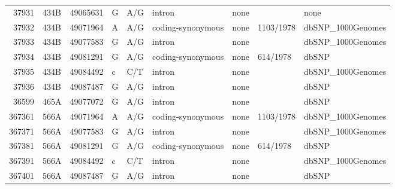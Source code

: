 \documentclass{article}
\begin{document}
\begin{table}[tbp]
{\begin{tabular}{rlrllllll}
  37931 & 434B & 49065631 & G & A/G & intron & none &  & none \\ 
  37932 & 434B & 49071964 & A & A/G & coding-synonymous & none & 1103/1978 & dbSNP\_1000Genomes \\ 
  37933 & 434B & 49077583 & G & A/G & intron & none &  & dbSNP\_1000Genomes \\ 
  37934 & 434B & 49081291 & G & A/G & coding-synonymous & none & 614/1978 & dbSNP \\ 
  37935 & 434B & 49084492 & c & C/T & intron & none &  & dbSNP\_1000Genomes \\ 
  37936 & 434B & 49087487 & G & A/G & intron & none &  & dbSNP \\ 
  36599 & 465A & 49077072 & G & A/G & intron & none &  & dbSNP \\ 
  367361 & 566A & 49071964 & A & A/G & coding-synonymous & none & 1103/1978 & dbSNP\_1000Genomes \\ 
  367371 & 566A & 49077583 & G & A/G & intron & none &  & dbSNP\_1000Genomes \\ 
  367381 & 566A & 49081291 & G & A/G & coding-synonymous & none & 614/1978 & dbSNP \\ 
  367391 & 566A & 49084492 & c & C/T & intron & none &  & dbSNP\_1000Genomes \\ 
  367401 & 566A & 49087487 & G & A/G & intron & none &  & dbSNP \\ 
   \hline
\end{tabular}
}
\end{table}
\end{document}
